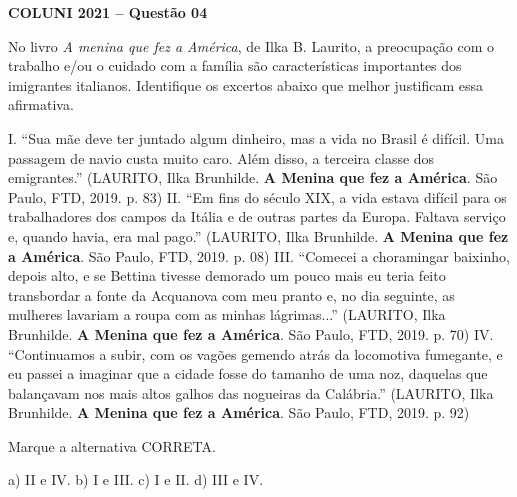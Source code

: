 \textbf{COLUNI 2021 -- Questão 04}\par\medskip No livro \textit{A menina que fez a América}, de Ilka B. Laurito, a preocupação com o trabalho e/ou o cuidado com a família são características importantes dos imigrantes italianos. Identifique os excertos abaixo que melhor justificam essa afirmativa.

\par

I. “Sua mãe deve ter juntado algum dinheiro, mas a vida no Brasil é difícil. Uma passagem de navio custa muito caro. Além disso, a terceira classe dos emigrantes.” (LAURITO, Ilka Brunhilde. \textbf{A Menina que fez a América}. São Paulo, FTD, 2019. p. 83) II. “Em fins do século XIX, a vida estava difícil para os trabalhadores dos campos da Itália e de outras partes da Europa. Faltava serviço e, quando havia, era mal pago.” (LAURITO, Ilka Brunhilde. \textbf{A Menina que fez a América}. São Paulo, FTD, 2019. p. 08) III. “Comecei a choramingar baixinho, depois alto, e se Bettina tivesse demorado um pouco mais eu teria feito transbordar a fonte da Acquanova com meu pranto e, no dia seguinte, as mulheres lavariam a roupa com as minhas lágrimas...” (LAURITO, Ilka Brunhilde. \textbf{A Menina que fez a América}. São Paulo, FTD, 2019. p. 70) IV. “Continuamos a subir, com os vagões gemendo atrás da locomotiva fumegante, e eu passei a imaginar que a cidade fosse do tamanho de uma noz, daquelas que balançavam nos mais altos galhos das nogueiras da Calábria.” (LAURITO, Ilka Brunhilde. \textbf{A Menina que fez a América}. São Paulo, FTD, 2019. p. 92)

\par

Marque a alternativa CORRETA.

\par

a) II e IV. b) I e III. c) I e II. d) III e IV.

